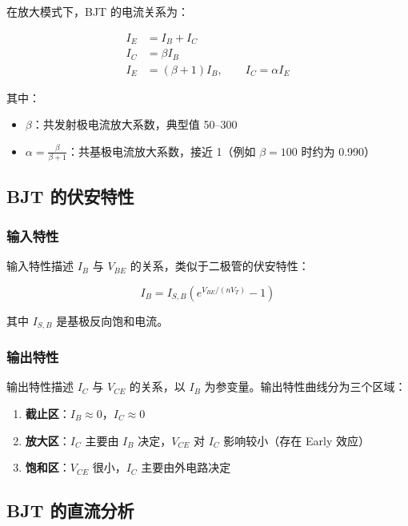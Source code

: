在放大模式下，BJT 的电流关系为：

\begin{align}
I_E &= I_B + I_C \label{eq:bjt-current-sum} \\
I_C &= \beta I_B \label{eq:bjt-current-gain} \\
I_E &= (\beta + 1) I_B, \qquad I_C = \alpha I_E \label{eq:bjt-emitter-current}
\end{align}

其中：
\begin{itemize}
  \item $\beta$：共发射极电流放大系数，典型值 50--300
  \item $\alpha = \frac{\beta}{\beta + 1}$：共基极电流放大系数，接近 1（例如 $\beta=100$ 时约为 0.990）
\end{itemize}

\subsection{BJT 的伏安特性}

\subsubsection{输入特性}

输入特性描述 $I_B$ 与 $V_{BE}$ 的关系，类似于二极管的伏安特性：

\begin{equation}
I_B = I_{S,B} \left(e^{V_{BE}/(nV_T)} - 1\right) \label{eq:bjt-base-current}
\end{equation}

其中 $I_{S,B}$ 是基极反向饱和电流。

\subsubsection{输出特性}

输出特性描述 $I_C$ 与 $V_{CE}$ 的关系，以 $I_B$ 为参变量。输出特性曲线分为三个区域：

\begin{enumerate}
  \item \textbf{截止区}：$I_B \approx 0$，$I_C \approx 0$
  \item \textbf{放大区}：$I_C$ 主要由 $I_B$ 决定，$V_{CE}$ 对 $I_C$ 影响较小（存在 Early 效应）
  \item \textbf{饱和区}：$V_{CE}$ 很小，$I_C$ 主要由外电路决定
\end{enumerate}

\subsection{BJT 的直流分析}


